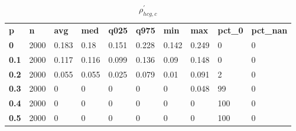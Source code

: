 \begin{table}[h]
 \centering 
\footnotesize
\caption{$\rho_{hcg,c}^\prime $}
\label{tab:alphahcgc}
\begin{tabular}[h]{| l l l l l l l l l l|
    } \hline
\textbf{ p} & \textbf{ n} & \textbf{ avg} & \textbf{ med} & \textbf{ q025} & \textbf{ q975} & \textbf{ min} & \textbf{ max} & \textbf{ pct\_0} & \textbf{ pct\_nan}
           \\
  \textbf{  0} & 2000 & 0.183 &  0.18 & 0.151 & 0.228 & 0.142 & 0.249 &   0 & 0
           \\
  \textbf{0.1} & 2000 & 0.117 & 0.116 & 0.099 & 0.136 &  0.09 & 0.148 &   0 & 0
           \\
  \textbf{0.2} & 2000 & 0.055 & 0.055 & 0.025 & 0.079 &  0.01 & 0.091 &   2 & 0
           \\
  \textbf{0.3} & 2000 &     0 &     0 &     0 &     0 &     0 & 0.048 &  99 & 0
           \\
  \textbf{0.4} & 2000 &     0 &     0 &     0 &     0 &     0 &     0 & 100 & 0
           \\
  \textbf{0.5} & 2000 &     0 &     0 &     0 &     0 &     0 &     0 & 100 & 0
           \\
 \hline \end{tabular}
 \end{table}
